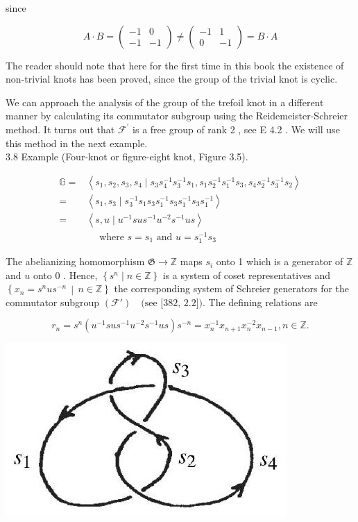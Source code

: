 \documentclass[10pt, letterpaper]{article}
\begin{document}
since

$$
A \cdot B=\left(\begin{array}{rr}
-1 & 0 \\
-1 & -1
\end{array}\right) \neq\left(\begin{array}{cc}
-1 & 1 \\
0 & -1
\end{array}\right)=B \cdot A
$$

The reader should note that here for the first time in this book the existence of non-trivial knots has been proved, since the group of the trivial knot is cyclic.

We can approach the analysis of the group of the trefoil knot in a different manner by calculating its commutator subgroup using the Reidemeister-Schreier method. It turns out that $\mathscr{F}^{\prime}$ is a free group of rank 2 , see E 4.2 . We will use this method in the next example.\\
3.8 Example (Four-knot or figure-eight knot, Figure 3.5).

$$
\begin{aligned}
\mathbb{G}= & \left\langle s_{1}, s_{2}, s_{3}, s_{4} \mid s_{3} s_{4}^{-1} s_{3}^{-1} s_{1}, s_{1} s_{2}^{-1} s_{1}^{-1} s_{3}, s_{4} s_{2}^{-1} s_{3}^{-1} s_{2}\right\rangle \\
= & \left\langle s_{1}, s_{3} \mid s_{3}^{-1} s_{1} s_{3} s_{1}^{-1} s_{3} s_{1}^{-1} s_{3} s_{1}^{-1}\right\rangle \\
= & \left\langle s, u \mid u^{-1} s u s^{-1} u^{-2} s^{-1} u s\right\rangle \\
& \quad \text { where } s=s_{1} \text { and } u=s_{1}^{-1} s_{3}
\end{aligned}
$$

The abelianizing homomorphism $\mathfrak{G} \rightarrow \mathbb{Z}$ maps $s_{i}$ onto 1 which is a generator of $\mathbb{Z}$ and $u$ onto 0 . Hence, $\left\{s^{n} \mid n \in \mathbb{Z}\right\}$ is a system of coset representatives and $\left\{ x_n = s^n u s^{-n} \,\middle|\, n \in \mathbb{Z} \right\}$ the corresponding system of Schreier generators for the commutator subgroup $\left(\mathscr{F}'\right) \quad \text{(see [382, 2.2])}$. The defining relations are

$$
r_{n}=s^{n}\left(u^{-1} s u s^{-1} u^{-2} s^{-1} u s\right) s^{-n}=x_{n}^{-1} x_{n+1} x_{n}^{-2} x_{n-1}, n \in \mathbb{Z} .
$$

\begin{center}
\includegraphics[scale=0.2]{2025_05_21_9c06be8de7a55410f8c1g-050}
\end{center}
\end{document}
